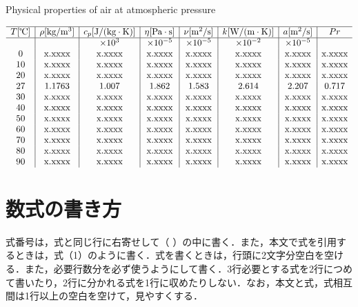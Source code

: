 \documentclass[a4jsme, fleqn, dvipdfmx]{jsmepaper}
\begin{document}
\begin{table}[t]
\begin{center}
\caption{Physical properties of air at atmospheric pressure}
$\begin{array}{c|c|c|c|c|c|c|c}
\hline
T[\mbox{℃}]&\rho [\mbox{kg}/\mbox{m}^3]&c_p[\mbox{J}/(\mbox{kg}\cdot\mbox{K})]&\eta [\mbox{Pa}\cdot\mbox{s}]&\nu [\mbox{m}^2/\mbox{s}]&k[\mbox{W}/(\mbox{m}\cdot\mbox{K})]&a[\mbox{m}^2/\mbox{s}]&Pr\\
\hline
&&\times 10^3&\times 10^{-5}&\times 10^{-5}&\times 10^{-2}&\times 10^{-5}&\\
0&\mbox{x.xxxx}&\mbox{x.xxxx}&\mbox{x.xxxx}&\mbox{x.xxxx}&\mbox{x.xxxx}&\mbox{x.xxxx}&\mbox{x.xxxx}\\
10&\mbox{x.xxxx}&\mbox{x.xxxx}&\mbox{x.xxxx}&\mbox{x.xxxx}&\mbox{x.xxxx}&\mbox{x.xxxx}&\mbox{x.xxxx}\\
20&\mbox{x.xxxx}&\mbox{x.xxxx}&\mbox{x.xxxx}&\mbox{x.xxxx}&\mbox{x.xxxx}&\mbox{x.xxxx}&\mbox{x.xxxx}\\
27&1.1763&1.007&1.862&1.583&2.614&2.207&0.717\\
30&\mbox{x.xxxx}&\mbox{x.xxxx}&\mbox{x.xxxx}&\mbox{x.xxxx}&\mbox{x.xxxx}&\mbox{x.xxxx}&\mbox{x.xxxx}\\
40&\mbox{x.xxxx}&\mbox{x.xxxx}&\mbox{x.xxxx}&\mbox{x.xxxx}&\mbox{x.xxxx}&\mbox{x.xxxx}&\mbox{x.xxxx}\\
50&\mbox{x.xxxx}&\mbox{x.xxxx}&\mbox{x.xxxx}&\mbox{x.xxxx}&\mbox{x.xxxx}&\mbox{x.xxxx}&\mbox{x.xxxx}\\
60&\mbox{x.xxxx}&\mbox{x.xxxx}&\mbox{x.xxxx}&\mbox{x.xxxx}&\mbox{x.xxxx}&\mbox{x.xxxx}&\mbox{x.xxxx}\\
70&\mbox{x.xxxx}&\mbox{x.xxxx}&\mbox{x.xxxx}&\mbox{x.xxxx}&\mbox{x.xxxx}&\mbox{x.xxxx}&\mbox{x.xxxx}\\
80&\mbox{x.xxxx}&\mbox{x.xxxx}&\mbox{x.xxxx}&\mbox{x.xxxx}&\mbox{x.xxxx}&\mbox{x.xxxx}&\mbox{x.xxxx}\\
90&\mbox{x.xxxx}&\mbox{x.xxxx}&\mbox{x.xxxx}&\mbox{x.xxxx}&\mbox{x.xxxx}&\mbox{x.xxxx}&\mbox{x.xxxx}
\end{array}$
\end{center}
\end{table}

\newpage
\section{数式の書き方}

式番号は，式と同じ行に右寄せして（ ）の中に書く．また，本文で式を引用するときは，式（1）のように書く．式を書くときは，行頭に2文字分空白を空ける．また，必要行数分を必ず使うようにして書く．3行必要とする式を2行につめて書いたり，2行に分かれる式を1行に収めたりしない．なお，本文と式，式相互間は1行以上の空白を空けて，見やすくする．
\end{document}
